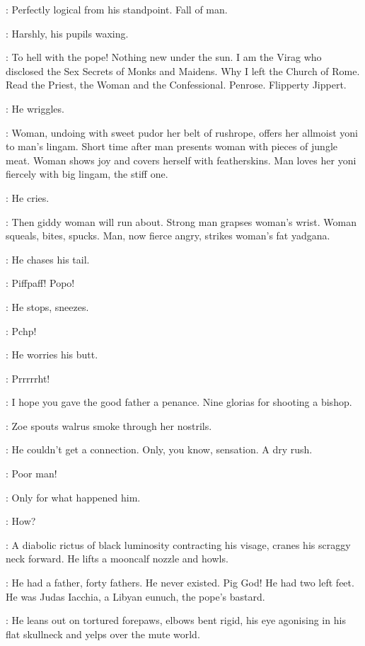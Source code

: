 \Virag:
Perfectly logical from his standpoint.
Fall of man.

:
Harshly, his pupils waxing.

\Virag:
To hell with the pope!
Nothing new under the sun.
I am the Virag who disclosed the Sex Secrets of Monks and Maidens.
Why I left the Church of Rome.
Read the Priest, the Woman and the Confessional.
Penrose.
Flipperty Jippert.

:
He wriggles.

\Virag:
Woman, undoing with sweet pudor her belt of rushrope,
offers her allmoist yoni to man's lingam.
Short time after man presents woman with pieces of jungle meat.
Woman shows joy and covers herself with featherskins.
Man loves her yoni fiercely with big lingam, the stiff one.

:
He cries.

\Virag:
Then giddy woman will run about.
Strong man grapses woman's wrist.
Woman squeals, bites, spucks.
Man, now fierce angry, strikes woman's fat yadgana.

:
He chases his tail.

\Virag:
Piffpaff!
Popo!

:
He stops, sneezes.

\Virag:
Pchp!

:
He worries his butt.

\Virag:
Prrrrrht!

\Lynch[2]:
I hope you gave the good father a penance.
Nine glorias for shooting a bishop.

:
Zoe spouts walrus smoke through her nostrils.

\Zoe:
He couldn't get a connection.
Only, you know, sensation.
A dry rush.

\Bloom:
Poor man!

\Zoe:
Only for what happened him.

\Bloom:
How?

:
A diabolic rictus of black luminosity contracting his visage,
cranes his scraggy neck forward.
He lifts a mooncalf nozzle and howls.

\Virag:
He had a father, forty fathers.
He never existed.
Pig God!
He had two left feet.
He was Judas Iacchia, a Libyan eunuch, the pope's bastard.

:
He leans out on tortured forepaws, elbows bent rigid,
his eye agonising in his flat skullneck and yelps over the mute world.

